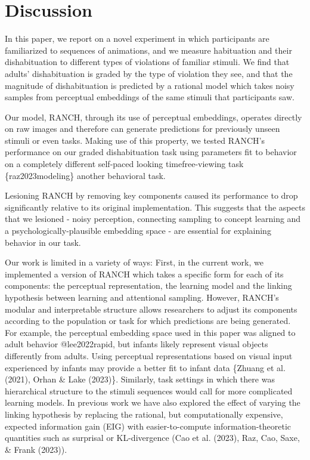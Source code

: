 \documentclass[10pt, letterpaper]{article}
\begin{document}
\hypertarget{discussion}{%
\section{Discussion}\label{discussion}}

In this paper, we report on a novel experiment in which participants are
familiarized to sequences of animations, and we measure habituation and
their dishabituation to different types of violations of familiar
stimuli. We find that adults' dishabituation is graded by the type of
violation they see, and that the magnitude of dishabituation is
predicted by a rational model which takes noisy samples from perceptual
embeddings of the same stimuli that participants saw.

Our model, RANCH, through its use of perceptual embeddings, operates
directly on raw images and therefore can generate predictions for
previously unseen stimuli or even tasks. Making use of this property, we
tested RANCH's performance on our graded dishabituation task using
parameters fit to behavior on a completely different self-paced looking
timefree-viewing task \{raz2023modeling\} another behavioral task.

Lesioning RANCH by removing key components caused its performance to
drop significantly relative to its original implementation. This
suggests that the aspects that we lesioned - noisy perception,
connecting sampling to concept learning and a psychologically-plausible
embedding space - are essential for explaining behavior in our task.

Our work is limited in a variety of ways: First, in the current work, we
implemented a version of RANCH which takes a specific form for each of
its components: the perceptual representation, the learning model and
the linking hypothesis between learning and attentional sampling.
However, RANCH's modular and interpretable structure allows researchers
to adjust its components according to the population or task for which
predictions are being generated. For example, the perceptual embedding
space used in this paper was aligned to adult behavior @lee2022rapid,
but infants likely represent visual objects differently from adults.
Using perceptual representations based on visual input experienced by
infants may provide a better fit to infant data \{Zhuang et al. (2021),
Orhan \& Lake (2023)\}. Similarly, task settings in which there was
hierarchical structure to the stimuli sequences would call for more
complicated learning models. In previous work we have also explored the
effect of varying the linking hypothesis by replacing the rational, but
computationally expensive, expected information gain (EIG) with
easier-to-compute information-theoretic quantities such as surprisal or
KL-divergence (Cao et al. (2023), Raz, Cao, Saxe, \& Frank (2023)).
\end{document}
